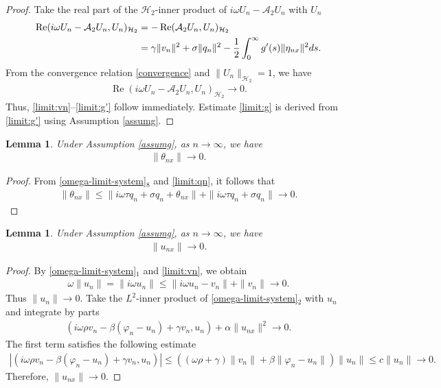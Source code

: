\documentclass[11pt,reqno]{article}
\newtheorem{lemma}[theorem]{Lemma}
\begin{document}
\begin{proof}
	Take the real part of the $\mathcal{H}_2$-inner product of $i \omega U_n - \mathcal{A}_2 U_n$ with $U_n$
	\begin{align*}
		\operatorname{Re} ( i \omega U_n - \mathcal{A}_2 U_n, U_n )_{\mathcal{H}_2}
		&= -\operatorname{Re} ( \mathcal{A}_2 U_n, U_n )_{\mathcal{H}_2}\notag\\
		&= \gamma\|v_n\|^2 + \sigma\|q_n\|^2 - \frac{1}{2}\int_{0}^{\infty} g'(s)\|\eta_{nx}\|^2ds.
	\end{align*}
	From the convergence relation \eqref{convergence} and $\|U_n\|_{\mathcal{H}_2} = 1$, we have
	\begin{align*}
		\operatorname{Re} ( i \omega U_n - \mathcal{A}_2 U_n, U_n )_{\mathcal{H}_2} \to 0.
	\end{align*}
	Thus, \eqref{limit:vn}--\eqref{limit:g'} follow immediately. Estimate \eqref{limit:g} is derived from \eqref{limit:g'} using Assumption \ref{assumg}.
\end{proof}
\begin{lemma}\label{iR:thetan}
	Under Assumption \ref{assumg}, as $n \to \infty$, we have
	\begin{align}
		\|\theta_{nx}\| \to 0.\label{limit:thetan}
	\end{align}
\end{lemma}
\begin{proof}
	From \eqref{omega-limit-system}$_8$ and \eqref{limit:qn}, it follows that
	\begin{align*}
		\|\theta_{nx}\| \leq \|i\omega\tau q_n + \sigma q_n + \theta_{nx}\| + \|i\omega\tau q_n + \sigma q_n\| \to 0.
	\end{align*}
\end{proof}
\begin{lemma}\label{iR:un}
	Under Assumption \ref{assumg}, as $n \to \infty$, we have
	\begin{align}
		\|u_{nx}\| \to 0.\label{limit:un}
	\end{align}
\end{lemma}
\begin{proof}
	By \eqref{omega-limit-system}$_1$ and \eqref{limit:vn}, we obtain
	\begin{align*}
		\omega\|u_n\| = \|i\omega u_n\| \leq \|i\omega u_n - v_n\| + \|v_n\| \to 0.
	\end{align*}
	Thus $\|u_n\| \to 0$.
	Take the $L^2$-inner product of \eqref{omega-limit-system}$_2$ with $u_n$ and integrate by parts
	\begin{align*}
		(i\omega\rho v_n - \beta(\varphi_n - u_n) + \gamma v_n, u_n) + \alpha\|u_{nx}\|^2 \rightarrow 0.
	\end{align*}
	The first term satisfies the following estimate
	\begin{align*}
		|(i\omega\rho v_n - \beta(\varphi_n - u_n) + \gamma v_n, u_n)| \leq (( \omega\rho + \gamma ) \|v_n\| + \beta \|\varphi_n - u_n\|) \|u_n\| \leq c \|u_n\| \rightarrow 0.
	\end{align*}
	Therefore, $\|u_{nx}\| \to 0$.
\end{proof}
\end{document}
